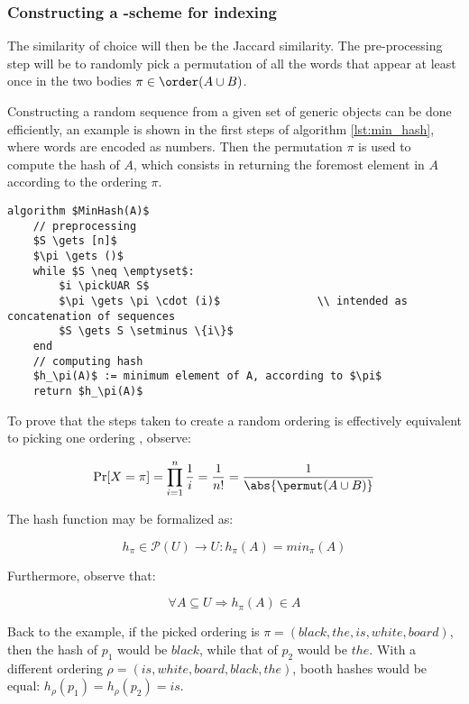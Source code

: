 \subsubsection{Constructing a \lsh-scheme for indexing}

The similarity of choice will then be the Jaccard similarity. The pre-processing step will be to randomly pick a permutation of all the words that appear at least once in the two bodies $\pi \in \order(A \cup B)$.

Constructing a random sequence from a given set of generic objects can be done efficiently, an example is shown in the first steps of algorithm \ref{lst:min_hash}, where words are encoded as numbers. Then the permutation $\pi$ is used to compute the hash of $A$, which consists in returning the foremost element in $A$ according to the ordering $\pi$.

\begin{lstlisting}[caption = {min hash or shingles algorithm}, label = {lst:min_hash}]
algorithm $MinHash(A)$
    // preprocessing
    $S \gets [n]$
    $\pi \gets ()$
    while $S \neq \emptyset$:
        $i \pickUAR S$
        $\pi \gets \pi \cdot (i)$               \\ intended as concatenation of sequences
        $S \gets S \setminus \{i\}$
    end
    // computing hash
    $h_\pi(A)$ := minimum element of A, according to $\pi$
    return $h_\pi(A)$
\end{lstlisting}

To prove that the steps taken to create a random ordering is effectively equivalent to picking one ordering \uar{}, observe:

\[
    \Pr[X = \pi] = \prod_{i = 1}^n \frac{1}{i} = \frac{1}{n!} = \frac{1}{\abs{\permut(A \cup B)}}
\]

The hash function may be formalized as:

\begin{equation}
    h_\pi \in \mathcal{P}(U) \to U : h_\pi(A) = min_\pi(A)
\end{equation}

Furthermore, observe that:

\[
    \forall A \subseteq U \Rightarrow h_\pi(A) \in A
\]

Back to the example, if the picked ordering is $\pi = (black, the, is, white, board)$, then the hash of $p_1$ would be $black$, while that of $p_2$ would be $the$. With a different ordering $\rho = (is, white, board, black, the)$, booth hashes would be equal: $h_\rho(p_1) = h_\rho(p_2) = is$.

